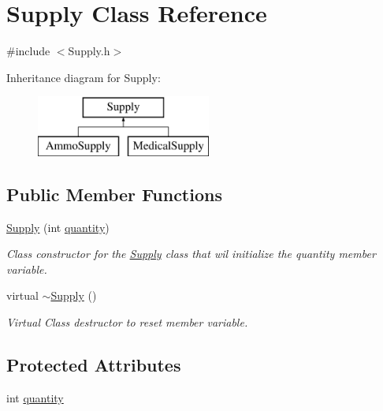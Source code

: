 \hypertarget{class_supply}{}\section{Supply Class Reference}
\label{class_supply}


{\ttfamily \#include $<$Supply.\+h$>$}

Inheritance diagram for Supply\+:\begin{figure}[H]
\begin{center}
\leavevmode
\includegraphics[height=2.000000cm]{class_supply}
\end{center}
\end{figure}
\subsection*{Public Member Functions}
\begin{DoxyCompactItemize}
\item 
\mbox{\hyperlink{class_supply_a10b11a01cd48bbea678e5be9e7862869}{Supply}} (int \mbox{\hyperlink{class_supply_a947a0ffbf0c36dc21d79c05f1a9f48a4}{quantity}})
\begin{DoxyCompactList}\small\item\em Class constructor for the \mbox{\hyperlink{class_supply}{Supply}} class that wil initialize the quantity member variable. \end{DoxyCompactList}\item 
virtual \mbox{\hyperlink{class_supply_a5702fbe83bf5514bbb728eb1e704fcb1}{$\sim$\+Supply}} ()
\begin{DoxyCompactList}\small\item\em Virtual Class destructor to reset member variable. \end{DoxyCompactList}\end{DoxyCompactItemize}
\subsection*{Protected Attributes}
\begin{DoxyCompactItemize}
\item 
int \mbox{\hyperlink{class_supply_a947a0ffbf0c36dc21d79c05f1a9f48a4}{quantity}}
\end{DoxyCompactItemize}


